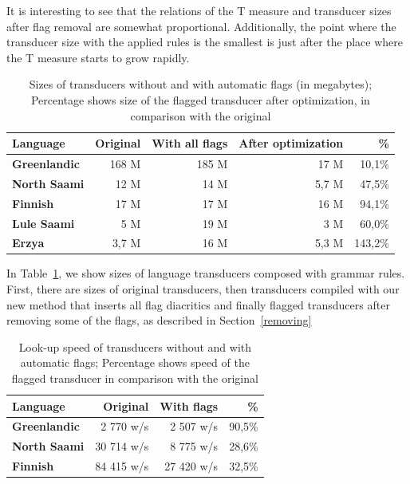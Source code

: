 \documentclass[10pt, a4paper]{article}
\begin{document}
It is interesting to see that the relations of the T measure and transducer sizes after flag removal are somewhat proportional. 
Additionally, the point where the transducer size with the applied rules is the smallest is just after the place where 
the T measure starts to grow rapidly. 

\begin{table}[!h]
    \centering
    \begin{tabular}{|l|r|r|r|r|}
        \hline
        \bf Language & \bf Original & \bf With all flags & \bf After optimization & \bf \% \\
        \hline\hline
        \bf Greenlandic &   168 M  & 	185	M& 17 M & 10,1\%  \\
        \bf North Saami &   12 M   &  14 M	& 5,7 M & 47,5\%  \\
        \bf Finnish &   17 M     	 &	17 M 	& 16 M & 94,1\%  \\
        \bf Lule Saami  &   5 M    & 	19 M 	& 3 M & 60,0\%  \\
        \bf Erzya       &   3,7 M  &  16 M 	& 5,3 M& 143,2\%  \\
        \hline
    \end{tabular}
    \caption{Sizes of transducers without and with automatic flags (in megabytes); Percentage shows size of the flagged transducer after optimization, in comparison with the original
    \label{table:sizes}}
\end{table}

In Table~\ref{table:sizes}, we show sizes of language transducers composed with grammar rules. First, there are sizes of original
transducers, then transducers compiled
with our new method that inserts all flag diacritics and finally flagged transducers after removing some of the flags, as described in Section~\ref{removing}


\begin{table}[h]
 \centering
    \begin{tabular}{|l|r|r|r|}
        \hline
        \bf Language & \bf Original & \bf With flags & \bf \% \\
        \hline\hline
        \bf Greenlandic & 2 770 w/s & 2 507 w/s & 90,5\%  \\
        \bf North Saami & 30 714 w/s & 8 775 w/s & 28,6\%  \\
        \bf Finnish  & 84 415 w/s & 27 420 w/s & 32,5\%  \\

        \hline
    \end{tabular}
    \caption{Look-up speed of transducers without and with automatic flags; Percentage shows speed of the flagged transducer in comparison with the original
    \label{table:lookup}}
\end{table}
\end{document}
